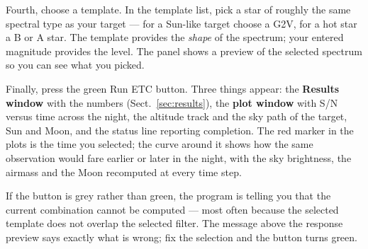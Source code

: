 Fourth, choose a template. In the template list, pick a star of roughly
the same spectral type as your target --- for a Sun-like target choose a
G2V, for a hot star a B or A star. The template provides the \emph{shape}
of the spectrum; your entered magnitude provides the level. The panel
shows a preview of the selected spectrum so you can see what you picked.

Finally, press the green \textsf{Run ETC} button. Three things appear:
the \textbf{Results window} with the numbers (Sect.~\ref{sec:results}),
the \textbf{plot window} with S/N versus time across the night, the
altitude track and the sky path of the target, Sun and Moon, and the
status line reporting completion. The red marker in the plots is the
time you selected; the curve around it shows how the same observation
would fare earlier or later in the night, with the sky brightness, the
airmass and the Moon recomputed at every time step.

If the button is grey rather than green, the program is telling you that
the current combination cannot be computed --- most often because the
selected template does not overlap the selected filter. The message above
the response preview says exactly what is wrong; fix the selection and
the button turns green.

